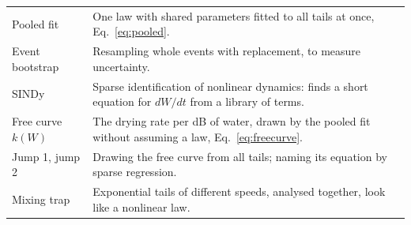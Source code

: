 \documentclass[11pt,a4paper]{article}
\begin{document}
\begin{tabularx}{\linewidth}{@{}l Y@{}}
Pooled fit & One law with shared parameters fitted to all tails at once, Eq.~\eqref{eq:pooled}. \\
Event bootstrap & Resampling whole events with replacement, to measure uncertainty. \\
SINDy & Sparse identification of nonlinear dynamics: finds a short equation for $dW/dt$ from a library of terms. \\
Free curve $k(W)$ & The drying rate per dB of water, drawn by the pooled fit without assuming a law, Eq.~\eqref{eq:freecurve}. \\
Jump 1, jump 2 & Drawing the free curve from all tails; naming its equation by sparse regression. \\
Mixing trap & Exponential tails of different speeds, analysed together, look like a nonlinear law. \\
\bottomrule
\end{tabularx}
\end{document}
